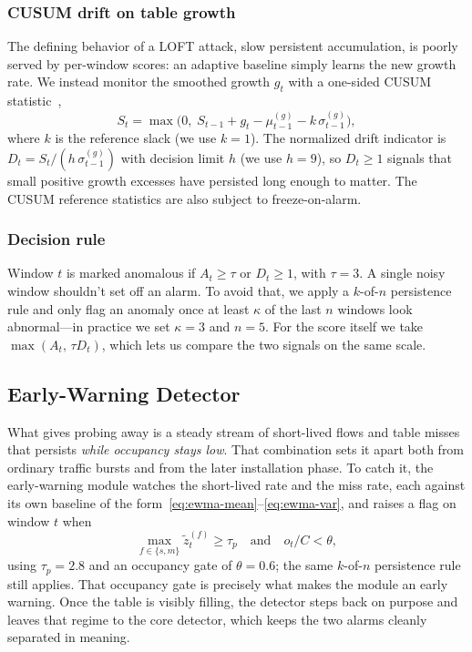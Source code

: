 \documentclass[conference]{IEEEtran}
\begin{document}
\subsubsection{CUSUM drift on table growth}
The defining behavior of a LOFT attack, slow persistent accumulation, is poorly
served by per-window scores: an adaptive baseline simply learns the new growth
rate. We instead monitor the smoothed growth $g_t$ with a one-sided CUSUM
statistic~\cite{page1954cusum},
\begin{equation}
S_t = \max\bigl(0,\; S_{t-1} + g_t - \mu_{t-1}^{(g)} - k\,\sigma_{t-1}^{(g)}\bigr),
\label{eq:cusum}
\end{equation}
where $k$ is the reference slack (we use $k = 1$). The normalized drift
indicator is $D_t = S_t / (h\,\sigma_{t-1}^{(g)})$ with decision limit $h$ (we
use $h = 9$), so $D_t \ge 1$ signals that small positive growth excesses have
persisted long enough to matter. The CUSUM reference statistics are also subject
to freeze-on-alarm.

\subsubsection{Decision rule}
Window $t$ is marked anomalous if $A_t \ge \tau$ or $D_t \ge 1$, with
$\tau = 3$. A single noisy window shouldn't set off an alarm. To avoid that, we apply a
$k$-of-$n$ persistence rule and only flag an anomaly once at least $\kappa$ of
the last $n$ windows look abnormal---in practice we set $\kappa = 3$ and
$n = 5$. For the score itself we take $\max(A_t,\, \tau D_t)$, which lets us
compare the two signals on the same scale.

\subsection{Early-Warning Detector}
What gives probing away is a steady stream of short-lived flows and table
misses that persists \emph{while occupancy stays low}. That combination sets it
apart both from ordinary traffic bursts and from the later installation phase.
To catch it, the early-warning module watches the short-lived rate and the miss
rate, each against its own baseline of the
form~\eqref{eq:ewma-mean}--\eqref{eq:ewma-var}, and raises a flag on window $t$
when
\begin{equation}
\max_{f \in \{s, m\}} \tilde z_t^{(f)} \ge \tau_p
\quad\text{and}\quad
o_t / C < \theta,
\label{eq:probe}
\end{equation}
using $\tau_p = 2.8$ and an occupancy gate of $\theta = 0.6$; the same
$k$-of-$n$ persistence rule still applies. That occupancy gate is precisely
what makes the module an early warning. Once the table is visibly filling, the
detector steps back on purpose and leaves that regime to the core detector,
which keeps the two alarms cleanly separated in meaning.
\end{document}
